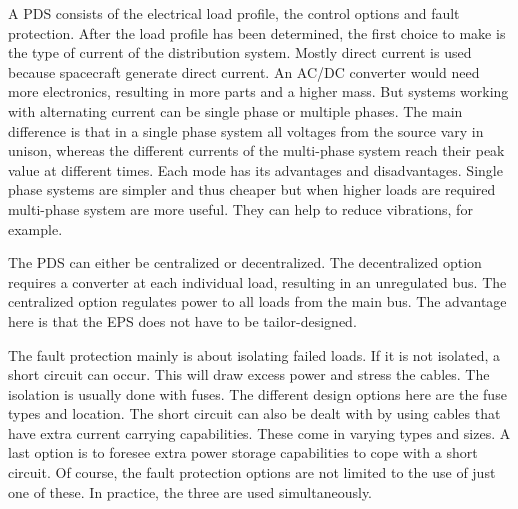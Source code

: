 A \ac{PDS} consists of the electrical load profile, the control options and fault protection.
After the load profile has been determined, the first choice to make is the type of current of the distribution system. Mostly direct current is used because spacecraft generate direct current. An AC/DC converter would need more electronics, resulting in more parts and a higher mass. 
But systems working with alternating current can be single phase or multiple phases\cite{kuphaldt}. The main difference is that in a single phase system all voltages from the source vary in unison, whereas the different currents of the multi-phase system reach their peak value at different times. Each mode has its advantages and disadvantages. Single phase systems are simpler and thus cheaper but when higher loads are required multi-phase system are more useful. They can help to reduce vibrations, for example.

The \ac{PDS} can either be centralized or decentralized. The decentralized option requires a converter at each individual load, resulting in an unregulated bus. The centralized option regulates power to all loads from the main bus. The advantage here is that the \ac{EPS} does not have to be tailor-designed. 

The fault protection mainly is about isolating failed loads. If it is not isolated, a short circuit can occur. This will draw excess power and stress the cables. The isolation is usually done with fuses. The different design options here are the fuse types and location.
The short circuit can also be dealt with by using cables that have extra current carrying capabilities. These come in varying types and sizes.
A last option is to foresee extra power storage capabilities to cope with a short circuit.
Of course, the fault protection options are not limited to the use of just one of these. In practice, the three are used simultaneously.
